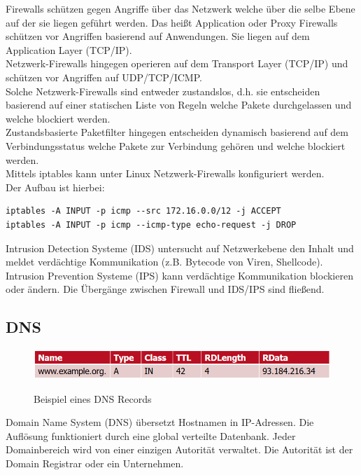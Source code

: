 \documentclass[a4paper,12pt,leqno]{article}
\begin{document}
Firewalls schützen gegen Angriffe über das Netzwerk welche über die selbe Ebene auf der sie liegen geführt werden. Das heißt Application oder Proxy Firewalls schützen vor Angriffen basierend auf Anwendungen. Sie liegen auf dem Application Layer (TCP/IP).\\
Netzwerk-Firewalls hingegen operieren auf dem Transport Layer (TCP/IP) und schützen vor Angriffen auf UDP/TCP/ICMP.\\
Solche Netzwerk-Firewalls sind entweder zustandslos, d.h. sie entscheiden basierend auf einer statischen Liste von Regeln welche Pakete durchgelassen und welche blockiert werden.\\
Zustandsbasierte Paketfilter hingegen entscheiden dynamisch basierend auf dem Verbindungsstatus welche Pakete zur Verbindung gehören und welche blockiert werden.\\

Mittels iptables kann unter Linux Netzwerk-Firewalls konfiguriert werden.\\
Der Aufbau ist hierbei:
\begin{lstlisting}
iptables -A INPUT -p icmp --src 172.16.0.0/12 -j ACCEPT
iptables -A INPUT -p icmp --icmp-type echo-request -j DROP
\end{lstlisting}
Intrusion Detection Systeme (IDS) untersucht auf Netzwerkebene den Inhalt und meldet verdächtige Kommunikation (z.B. Bytecode von Viren, Shellcode). Intrusion Prevention Systeme (IPS) kann verdächtige Kommunikation blockieren oder ändern. Die Übergänge zwischen Firewall und IDS/IPS sind fließend.

\subsection{DNS}

\begin{figure}[h!]
\centering
\includegraphics[scale=0.5]{Grafiken/DNS-Record.png}
\label{pic:DNS-Record}
\caption{Beispiel eines DNS Records}
\end{figure}

Domain Name System (DNS) übersetzt Hostnamen in IP-Adressen. Die Auflösung funktioniert durch eine global verteilte Datenbank. Jeder Domainbereich wird von einer einzigen Autorität verwaltet. Die Autorität ist der Domain Registrar oder ein Unternehmen.\\
\end{document}
